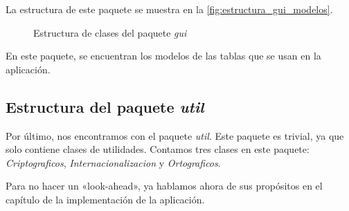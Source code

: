 La estructura de este paquete se muestra en la \autoref{fig:estructura_gui_modelos}.

\begin{figure}[h]
    \centering
    \caption{Estructura de clases del paquete \textit{gui}}
    \label{fig:estructura_gui_modelos}
\end{figure}

En este paquete, se encuentran los modelos de las tablas que se usan en la aplicación.

\subsection{Estructura del paquete \textit{util}}\label{subsec:estructura_del_paquete_util}
Por último, nos encontramos con el paquete \textit{util}.
Este paquete es trivial, ya que solo contiene clases de utilidades.
Contamos tres clases en este paquete: \textit{Criptograficos}, \textit{Internacionalizacion} y \textit{Ortograficos}.

Para no hacer un «look-ahead», ya hablamos ahora de sus propósitos en el capítulo de la implementación de la aplicación.

\newpage